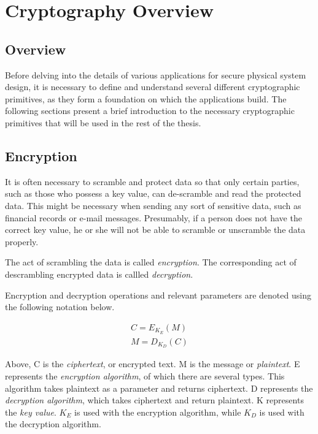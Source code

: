 \chapter{Cryptography Overview}
\label{chapter:cryptographyoverview}

\section{Overview}
Before delving into the details of various applications for secure physical system design,
it is necessary to define and understand several different
cryptographic primitives, as they form a foundation on which the applications build. The following sections present a brief
introduction to the necessary cryptographic primitives that will be used in the rest of the thesis.

\section{Encryption}
It is often necessary to scramble and protect data so that only certain parties, such as those who
possess a key value, can de-scramble and read the protected data. This might be necessary when
sending any sort of sensitive data, such as financial records or e-mail messages. Presumably, if a 
person does not have the correct key value, he or she will not be able to scramble or unscramble
the data properly.

The act of scrambling the data is called \emph{encryption}. The corresponding act of descrambling
encrypted data is callled \emph{decryption}.

Encryption and decryption operations and relevant parameters are denoted using the following notation below.

\begin{align}
C = E_{K_E}(M) \\
M = D_{K_D}(C)
\end{align}

Above, C is the \emph{ciphertext}, or encrypted text.  
M is the message or \emph{plaintext}. 
E represents the \emph{encryption algorithm}, of which there are several types. This algorithm takes plaintext as a parameter and returns ciphertext.
D represents the \emph{decryption algorithm}, which takes ciphertext and return plaintext.
K represents the \emph{key value}. $K_E$ is used with the encryption algorithm, while $K_D$ is used with the decryption algorithm.

